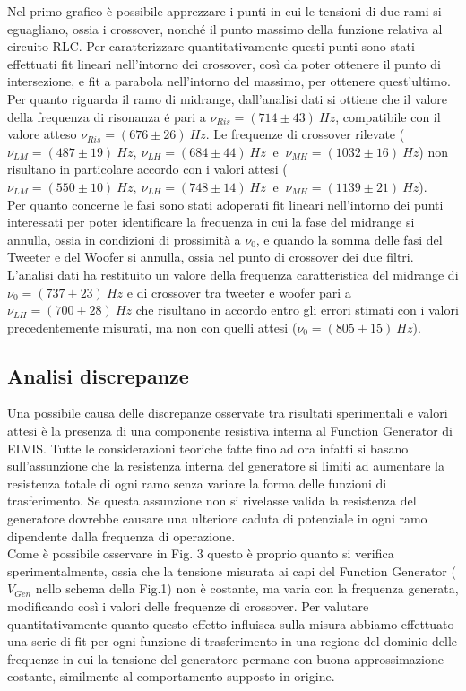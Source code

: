 \documentclass[]{article}
\begin{document}
Nel primo grafico è possibile apprezzare i punti in cui le tensioni di due rami si eguagliano, ossia i crossover, nonché il punto massimo della funzione relativa al circuito RLC. Per caratterizzare quantitativamente questi punti sono stati effettuati fit lineari nell'intorno dei crossover, così da poter ottenere il punto di intersezione, e fit a parabola nell'intorno del massimo, per ottenere quest'ultimo. Per quanto riguarda il ramo di midrange, dall'analisi dati si ottiene che il valore della frequenza di risonanza é pari a $ \nu_{Ris}=(714\pm43)\: Hz$, compatibile con il valore atteso $ \nu_{Ris}=(676\pm26)\: Hz$. Le frequenze di crossover rilevate ($ \nu_{LM}=(487\pm19)\:Hz,\: \nu_{LH}=(684\pm44)\:Hz\: $ e $\: \nu_{MH}=(1032\pm16)\:Hz $) non risultano in particolare accordo con i valori attesi ($ \nu_{LM}= (550 \pm 10) \:Hz,\: \nu_{LH}= (748
\pm 14 )\:Hz \:$ e $\: \nu_{MH}= (1139\pm 21 )\:Hz $). \\
\hspace*{\parindent}Per quanto concerne le fasi sono stati adoperati fit lineari nell'intorno dei punti interessati per poter identificare la frequenza in cui la fase del midrange si annulla, ossia in condizioni di prossimità a $\nu_0$, e quando la somma delle fasi del Tweeter e del Woofer si annulla, ossia nel punto di crossover dei due filtri. L'analisi dati ha restituito un valore della frequenza caratteristica del midrange di $ \nu_{0}=(737\pm23)\: Hz$ e di crossover tra tweeter e woofer pari a $ \nu_{LH}=(700\pm28)\:Hz$ che risultano in accordo entro gli errori stimati con i valori precedentemente misurati, ma non con quelli attesi ($ \nu_{0}=(805\pm15)\: Hz$).
\subsection{Analisi discrepanze}
\hspace*{\parindent}Una possibile causa delle discrepanze osservate tra risultati sperimentali e valori attesi è la presenza di una componente resistiva interna al Function Generator di ELVIS. Tutte le considerazioni teoriche fatte fino ad ora infatti si basano sull'assunzione che la resistenza interna del generatore si limiti ad aumentare la resistenza totale di ogni ramo senza variare la forma delle funzioni di trasferimento. Se questa assunzione non si rivelasse valida la resistenza del generatore dovrebbe causare una ulteriore caduta di potenziale in ogni ramo dipendente dalla frequenza di operazione.\\
\hspace*{\parindent}Come è possibile osservare in Fig. 3 questo è proprio quanto si verifica sperimentalmente, ossia che la tensione misurata ai capi del Function Generator ($V_{Gen}$ nello schema della Fig.1) non è costante, ma varia con la frequenza generata, modificando così i valori delle frequenze di crossover.
Per valutare quantitativamente quanto questo effetto influisca sulla misura abbiamo effettuato una serie di fit per ogni funzione di trasferimento in una regione del dominio delle frequenze in cui la tensione del generatore permane con buona approssimazione costante, similmente al comportamento supposto in origine.\\ 
\end{document}
